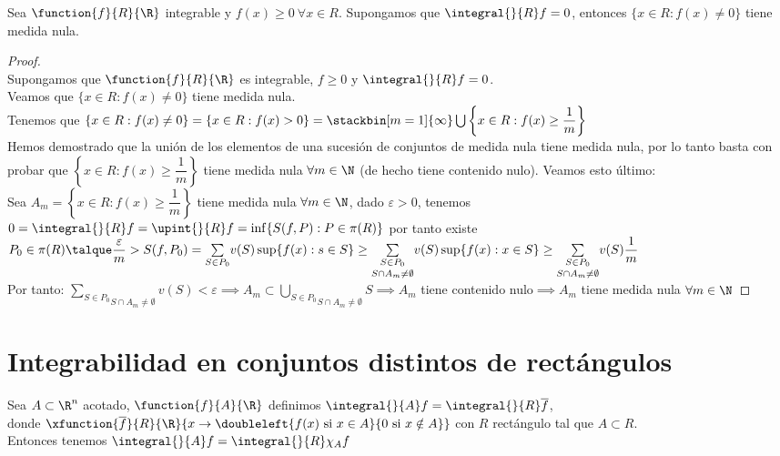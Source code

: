 	\begin{proposicion} Sea $\function{f}{R}{\R}$ integrable y $f(x)\geq 0\ \forall x\in R$. Supongamos que $\integral{}{R}f=0$, entonces $\{x\in R:f(x)\neq 0\}$ tiene medida nula.
	\begin{proof} \ \\
	Supongamos que $\function{f}{R}{\R}$ es integrable, $f\geq 0$ y $\integral{}{R}f=0$.\\
	Veamos que $\{x\in R:f(x)\neq 0\}$ tiene medida nula.\\
	Tenemos que $\{x\in R:f(x)\neq 0\}=\{x\in R:f(x)>0\}=\stackbin[m=1]{\infty}\bigcup\left\{x\in R:f(x)\geq \dfrac{1}{m}\right\}$\\
	Hemos demostrado que la unión de los elementos de una sucesión de conjuntos de medida nula tiene medida nula, por lo tanto basta con probar que $\left\{x\in R:f(x)\geq \dfrac{1}{m}\right\}$ tiene medida nula $\forall m\in\N$ (de hecho tiene contenido nulo). Veamos esto último:\\
	Sea $A_m=\left\{x\in R:f(x)\geq \dfrac{1}{m}\right\}$ tiene medida nula $\forall m\in\N$, dado $\varepsilon >0$, tenemos\\
	$0=\integral{}{R}f=\upint{}{R}f=\inf\{S(f,P):P\in\pi(R)\}$ por tanto existe $P_0\in \pi(R)\talque\dfrac{\varepsilon}{m}>S(f,P_0)=\underset{S\in P_0}\sum v(S)\sup\{f(x):s\in S\}\geq \underset{S\cap A_m\neq\emptyset}{\underset{S\in P_0}\sum}v(S)\sup\{f(x):x\in S\}\geq\underset{S\cap A_m\neq\emptyset}{\underset{S\in P_0}\sum} v(S)\dfrac{1}{m} $\\ 
	Por tanto: $\underset{S\cap A_m\neq\emptyset}{\underset{S\in P_0}\sum}v(S)<\varepsilon\implies A_m\subset \underset{S\cap A_m\neq\emptyset}{\underset{S\in P_0}\bigcup}S\implies A_m$ tiene contenido nulo$\implies A_m$ tiene medida nula $\forall m\in \N$
	\end{proof}
	\end{proposicion}
	
	\section{Integrabilidad en conjuntos distintos de rectángulos}
	\begin{defi} Sea $A\subset\R^n$ acotado, $\function{f}{A}{\R}$ definimos $\integral{}{A}f=\integral{}{R}\overline{f}$,\\
	donde $\xfunction{\overline{f}}{R}{\R}{x\to\doubleleft{f(x) \mathrm{\ si\ }x\in A}{0 \mathrm{\ si\ }x\notin A}}$ con $R$ rectángulo tal que $A\subset R$. \\
	Entonces tenemos $\integral{}{A}f=\integral{}{R}\chi_A f$
	\end{defi}
	
